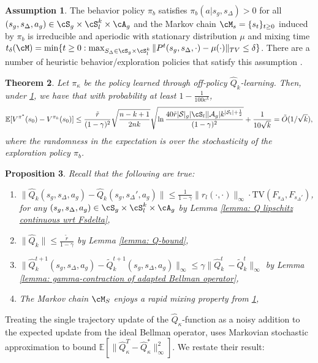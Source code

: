 \documentclass{article}
\theoremstyle{plain}
\newtheorem{theorem}{Theorem}[section]
\newtheorem{proposition}[theorem]{Proposition}
\theoremstyle{definition}
\newtheorem{assumption}[theorem]{Assumption}
\def\E{\mathbb{E}}
\begin{document}
\begin{assumption}\label{assumption: ergodic}
    The behavior policy $\pi_b$ satisfies $\pi_b(a|s_g, s_\Delta)>0$ for all $(s_g, s_\Delta, a_g)\in \cS_g \times \cS_l^k \times\cA_g$ and the Markov chain $\cM_{s} = \{s_t\}_{t\geq 0}$ induced by $\pi_b$ is irreducible and aperiodic with stationary distribution $\mu$ and mixing time $t_\delta(\cM) = \min \{t\geq 0: \max_{S_\Delta \in \cS_g\times\cS_l^k} \|P^t(s_g,s_\Delta,\cdot) - \mu(\cdot)\|_{TV} \leq \delta\}$. There are a number of heuristic behavior/exploration  policies that satisfy this assumption \citep{fujimoto2019off}.\\
\end{assumption}

\begin{theorem}
    Let $\pi_\kappa$ be the policy learned through off-policy $\hat{Q}_k$-learning. Then, under \cref{assumption: ergodic}, we have that with probability at least $1 - \frac{1}{100e^k}$,
\begin{equation}
\E[V^{\pi^*}(s_0) - V^{\pi_{k}}(s_0)] \leq \frac{\tilde{r}}{(1-\gamma)^2}\sqrt{\frac{n-k+1}{2n k}} \sqrt{\ln\frac{40\tilde{r}|\mathcal{S}|_g |\cS_l| |\mathcal{A}_g| k^{|\mathcal{S}_l|+\frac{1}{2}}}{(1-\gamma)^2}}  + \frac{1}{10\sqrt{k}} = \tilde{O}(1/\sqrt{k}),\end{equation}
where the randomness in the expectation is over the stochasticity of the exploration policy $\pi_b$.\\
\end{theorem}

\begin{proposition}\label{fake assumptions}
    Recall that the following are true:
    
    \begin{enumerate}
        \item $\|\hat{Q}_k(s_g, s_\Delta, a_g) - \hat{Q}_k(s_g, s_\Delta', a_g)\| \leq \frac{1}{1-\gamma}\|r_l(\cdot,\cdot)\|_\infty \cdot \mathrm{TV}(F_{s_\Delta}, F_{s_\Delta'})$, for any $(s_g,s_\Delta,a_g) \in \cS_g\times\cS_l^k \times\cA_g$ by Lemma \ref{lemma: Q lipschitz continuous wrt Fsdelta},
        \item $\|\hat{Q}_k\| \leq \frac{\tilde{r}}{1-\gamma}$ by Lemma \ref{lemma: Q-bound},
        \item $\|\hat{Q}^{t+1}_k(s_g, s_\Delta, a_g) - \tilde{Q}_k^{t+1}(s_g, s_\Delta, a_g)\|_\infty \leq \gamma\|\hat{Q}_k^t\ - \tilde{Q}_k^t \|_\infty$ by Lemma \ref{lemma: gamma-contraction of adapted Bellman operator},
        \item The Markov chain $\cM_S$ enjoys a rapid mixing property from \cref{assumption: ergodic},
    \end{enumerate}
\end{proposition}
Treating the single trajectory update of the $\hat{Q}_\kappa$-function as a noisy addition to the expected update from the ideal Bellman operator, \citet{chen2021lyapunov} uses Markovian stochastic approximation to bound $\E[\|\hat{Q}_\kappa^T - \hat{Q}_\kappa^*\|_\infty^2]$. We restate their result:\\
\end{document}
